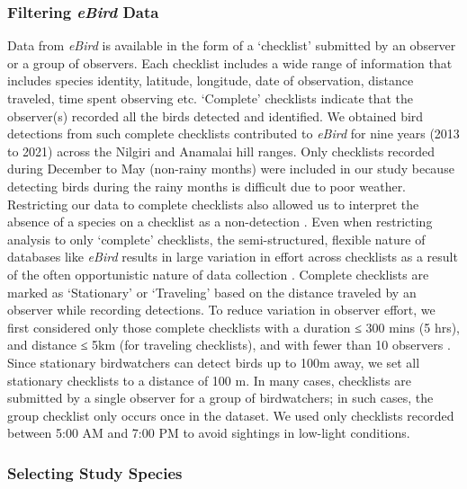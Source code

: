 \subsubsection*{Filtering \textit{eBird} Data}

Data from \textit{eBird} is available in the form of a `checklist' submitted by an observer or a group of observers.
Each checklist includes a wide range of information that includes species identity, latitude, longitude, date of observation, distance traveled, time spent observing etc.
`Complete' checklists indicate that the observer(s) recorded all the birds detected and identified.
We obtained bird detections from such complete checklists contributed to \textit{eBird} for nine years (2013 to 2021) across the Nilgiri and Anamalai hill ranges.
Only checklists recorded during December to May (non-rainy months) were included in our study because detecting birds during the rainy months is difficult due to poor weather.
Restricting our data to complete checklists also allowed us to interpret the absence of a species on a checklist as a non-detection \citep[called zero-filling][]{johnston2021}.
Even when restricting analysis to only `complete' checklists, the semi-structured, flexible nature of databases like \textit{eBird} results in large variation in effort across checklists as a result of the often opportunistic nature of data collection \citep{kelling2019}.
Complete checklists are marked as `Stationary' or `Traveling' based on the distance traveled by an observer while recording detections.
To reduce variation in observer effort, we first considered only those complete checklists with a duration ≤ 300 mins (5 hrs), and distance ≤ 5km (for traveling checklists), and with fewer than 10 observers \citep[following][]{johnston2019}.
Since stationary birdwatchers can detect birds up to 100m away, we set all stationary checklists to a distance of 100 m.
In many cases, checklists are submitted by a single observer for a group of birdwatchers; in such cases, the group checklist only occurs once in the dataset.
We used only checklists recorded between 5:00 AM and 7:00 PM to avoid sightings in low-light conditions.

\subsubsection*{Selecting Study Species}

